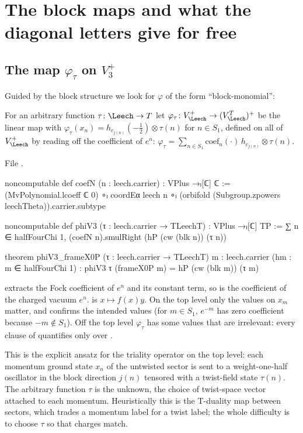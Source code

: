 \section{The block maps and what the diagonal letters give for free}\label{ch13:sec:block}

\subsection{\texorpdfstring{The map $\varphi_\tau$ on $V_3^+$}{The map varphitau on V3+}}
Guided by the block structure we look for $\varphi$ of the form ``block-monomial'':
\begin{definition}\label{ch13:def:phiV3}
For an arbitrary function $\tau\colon\Leech\to T$ let $\varphi_\tau\colon V_\Leech^+\to(V_\Leech^T)^+$ be the linear
map with $\varphi_\tau(x_n)=h_{c_{j(n)}}(-\tfrac12)\otimes\tau(n)$ for $n\in S_1$, defined on all of
$V_\Leech^+$ by reading off the coefficient of $e^n$: $\varphi_\tau=\sum_{n\in S_1}\mathrm{coef}_n(\cdot)\,
h_{c_{j(n)}}\otimes\tau(n)$.
\end{definition}
\noindent File .
\begin{leancode}
noncomputable def coefN (n : leech.carrier) : VPlus →ₗ[ℂ] ℂ :=
  (MvPolynomial.lcoeff ℂ 0) ∘ₗ coordEα leech n ∘ₗ (orbifold (Subgroup.zpowers leechTheta)).carrier.subtype

noncomputable def phiV3 (τ : leech.carrier → TLeechT) : VPlus →ₗ[ℂ] TP :=
  ∑ n ∈ halfFourChi 1, (coefN n).smulRight (hP (cw (blk n)) (τ n))

theorem phiV3_frameX0P (τ : leech.carrier → TLeechT) {m : leech.carrier} (hm : m ∈ halfFourChi 1) :
    phiV3 τ (frameX0P m) = hP (cw (blk m)) (τ m)
\end{leancode}
\begin{dictionary}
 extracts the Fock coefficient of $e^n$ and  its constant term,
so  is the coefficient of the charged vacuum $e^n$.  is $x\mapsto
f(x)y$. On the top level only the values on $x_m$ matter, and  confirms the
intended values (for $m\in S_1$, $e^{-m}$ has zero coefficient because $-m\notin S_1$). Off the top level
$\varphi_\tau$ has some values that are irrelevant: every clause of  quantifies only over
.
\end{dictionary}
\begin{physics}
This is the explicit ansatz for the triality operator on the top level: each momentum ground state $x_n$ of the untwisted sector is sent to a weight-one-half oscillator in the block direction $j(n)$ tensored with a twist-field state $\tau(n)$. The arbitrary function $\tau$ is the unknown, the choice of twist-space vector attached to each momentum. Heuristically this is the T-duality map between sectors, which trades a momentum label for a twist label; the whole difficulty is to choose $\tau$ so that charges match.
\end{physics}

